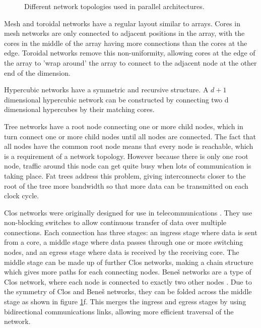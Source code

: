 \documentclass[a4paper, 12pt]{article}
\begin{document}
\begin{figure}[H]
{}
\caption[Different network topologies used in parallel architectures]{Different network topologies used in parallel architectures. \cite{Han14}}
\label{fig:topologies}
\end{figure}

Mesh and toroidal networks have a regular layout similar to arrays. Cores in mesh networks are only connected to adjacent positions in the array, with the cores in the middle of the array having more connections than the cores at the edge. Toroidal networks remove this non-uniformity, allowing cores at the edge of the array to 'wrap around' the array to connect to the adjacent node at the other end of the dimension.

Hypercubic networks have a symmetric and recursive structure. A $d+1$ dimensional hypercubic network can be constructed by connecting two d dimensional hypercubes by their matching cores. 

Tree networks have a root node connecting one or more child nodes, which in turn connect one or more child nodes until all nodes are connected. The fact that all nodes have the common root node means that every node is reachable, which is a requirement of a network topology. However because there is only one root node, traffic around this node can get quite busy when lots of communication is taking place. Fat trees address this problem, giving interconnects closer to the root of the tree more bandwidth so that more data can be transmitted on each clock cycle.

Clos networks were originally designed for use in telecommunications \cite{Clo53}. They use non-blocking switches to allow continuous transfer of data over multiple connections. Each connection has three stages: an ingress stage where data is sent from a core, a middle stage where data passes through one or more switching nodes, and an egress stage where data is received by the receiving core. The middle stage can be made up of further Clos networks, making a chain structure which gives more paths for each connecting nodes. Bene\v{s} networks are a type of Clos network, where each node is connected to exactly two other nodes \cite{Ben65}. Due to the symmetry of Clos and Bene\v{s} networks, they can be folded across the middle stage as shown in figure \ref{fig:topologies}f. This merges the ingress and egress stages by using bidirectional communications links, allowing more efficient traversal of the network.
\end{document}
